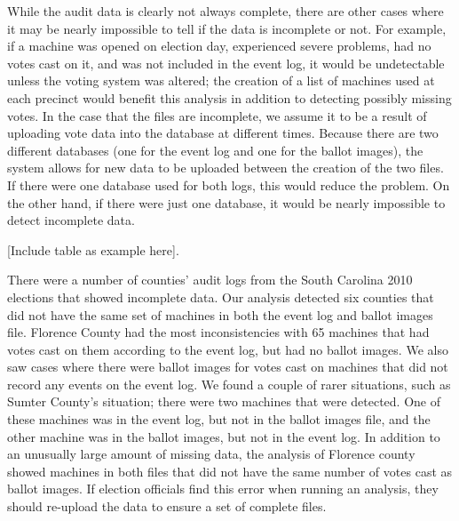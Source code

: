 While the audit data is clearly not always complete, there are other cases where it may be nearly impossible to tell if the data is incomplete or not.  For example, if a machine was opened on election day, experienced severe problems, had no votes cast on it, and was not included in the event log, it would be undetectable unless the voting system was altered; the creation of a list of machines used at each precinct would benefit this analysis in addition to detecting possibly missing votes.  In the case that the files are incomplete, we assume it to be a result of uploading vote data into the database at different times.  Because there are two different databases (one for the event log and one for the ballot images), the system allows for new data to be uploaded between the creation of the two files.  If there were one database used for both logs, this would reduce the problem.  On the other hand, if there were just one database, it would be nearly impossible to detect incomplete data.  

[Include table as example here].

There were a number of counties' audit logs from the South Carolina 2010 elections that showed incomplete data.  Our analysis detected six counties that did not have the same set of machines in both the event log and ballot images file.  Florence County had the most inconsistencies with 65 machines that had votes cast on them according to the event log, but had no ballot images.  We also saw cases where there were ballot images for votes cast on machines that did not record any events on the event log.  We found a couple of rarer situations, such as Sumter County's situation; there were two machines that were detected.  One of these machines was in the event log, but not in the ballot images file, and the other machine was in the ballot images, but not in the event log.  In addition to an unusually large amount of missing data, the analysis of Florence county showed machines in both files that did not have the same number of votes cast as ballot images.  If election officials find this error when running an analysis,  they should re-upload the data to ensure a set of complete files. 
